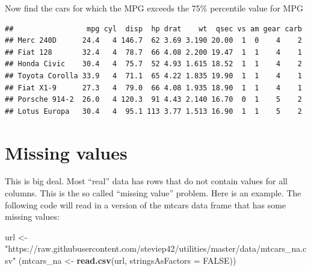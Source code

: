 \documentclass[]{book}
\newenvironment{Shaded}{\begin{snugshade}}{\end{snugshade}}
\newcommand{\DataTypeTok}[1]{\textcolor[rgb]{0.13,0.29,0.53}{#1}}
\newcommand{\DecValTok}[1]{\textcolor[rgb]{0.00,0.00,0.81}{#1}}
\newcommand{\KeywordTok}[1]{\textcolor[rgb]{0.13,0.29,0.53}{\textbf{#1}}}
\newcommand{\NormalTok}[1]{#1}
\newcommand{\OperatorTok}[1]{\textcolor[rgb]{0.81,0.36,0.00}{\textbf{#1}}}
\newcommand{\OtherTok}[1]{\textcolor[rgb]{0.56,0.35,0.01}{#1}}
\newcommand{\StringTok}[1]{\textcolor[rgb]{0.31,0.60,0.02}{#1}}
\begin{document}
Now find the cars for which the MPG exceeds the 75\% percentile value for MPG

\begin{Shaded}
\end{Shaded}

\begin{verbatim}
##                 mpg cyl  disp  hp drat    wt  qsec vs am gear carb
## Merc 240D      24.4   4 146.7  62 3.69 3.190 20.00  1  0    4    2
## Fiat 128       32.4   4  78.7  66 4.08 2.200 19.47  1  1    4    1
## Honda Civic    30.4   4  75.7  52 4.93 1.615 18.52  1  1    4    2
## Toyota Corolla 33.9   4  71.1  65 4.22 1.835 19.90  1  1    4    1
## Fiat X1-9      27.3   4  79.0  66 4.08 1.935 18.90  1  1    4    1
## Porsche 914-2  26.0   4 120.3  91 4.43 2.140 16.70  0  1    5    2
## Lotus Europa   30.4   4  95.1 113 3.77 1.513 16.90  1  1    5    2
\end{verbatim}

\hypertarget{missing-values}{%
\section{Missing values}\label{missing-values}}

This is big deal. Most ``real'' data has rows that do not contain values for all columns. This is the so called ``missing value'' problem. Here is an example. The following code will read in a version of the mtcars data frame that has some missing values:

\begin{Shaded}
\begin{Highlighting}[]
\NormalTok{url <-}\StringTok{ "https://raw.githubusercontent.com/steviep42/utilities/master/data/mtcars_na.csv"}
\NormalTok{(mtcars_na <-}\StringTok{ }\KeywordTok{read.csv}\NormalTok{(url, }\DataTypeTok{stringsAsFactors =} \OtherTok{FALSE}\NormalTok{))}
\end{Highlighting}
\end{Shaded}
\end{document}
